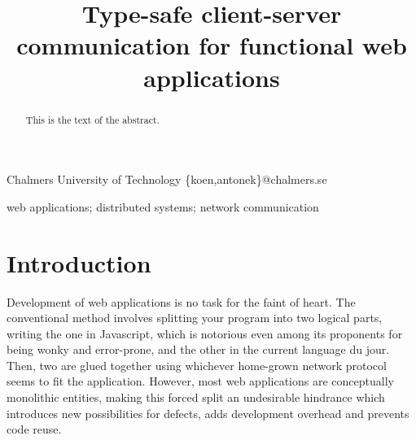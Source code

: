 \documentclass[preprint]{sigplanconf}
\begin{document}
\setlength{\pdfpageheight}{\paperheight}
\setlength{\pdfpagewidth}{\paperwidth}






\title{Type-safe client-server communication for functional web applications}

           {Chalmers University of Technology}
           {\{koen,antonek\}@chalmers.se}

\maketitle

\begin{abstract}
This is the text of the abstract.
\end{abstract}


%
\keywords
web applications; distributed systems; network communication

\section{Introduction}

Development of web applications is no task for the faint of heart.
The conventional method involves splitting your program into two logical parts,
writing the one in Javascript, which is notorious even among its proponents for
being wonky and error-prone, and the other in the current language du jour.
Then, two are glued together using whichever home-grown network protocol seems
to fit the application. However, most web applications are conceptually
monolithic entities, making this forced split an undesirable hindrance which
introduces new possibilities for defects, adds development overhead and
prevents code reuse.
\end{document}
